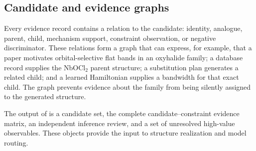 \subsection{Candidate and evidence graphs}

Every evidence record contains a relation to the candidate: identity, analogue, parent, child, mechanism support, constraint observation, or negative discriminator.  These relations form a graph that can express, for example, that a paper motivates orbital-selective flat bands in an oxyhalide family; a database record supplies the NbOCl$_2$ parent structure; a substitution plan generates a related child; and a learned Hamiltonian supplies a bandwidth for that exact child.  The graph prevents evidence about the family from being silently assigned to the generated structure.

The output of \matevidence is a candidate set, the complete candidate--constraint evidence matrix, an independent inference review, and a set of unresolved high-value observables.  These objects provide the input to structure realization and model routing.

